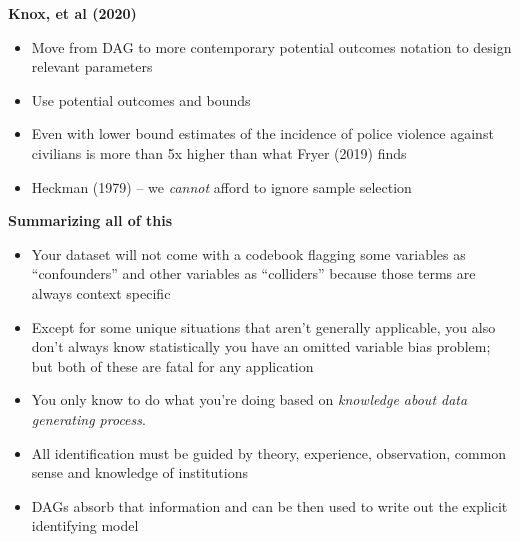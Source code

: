 \documentclass[notes=show]{beamer}
\begin{document}
\begin{frame}[plain]
\begin{center}
\textbf{Knox, et al (2020)}
\end{center}

\begin{itemize}
\item Move from DAG to more contemporary potential outcomes notation to design relevant parameters
\item Use potential outcomes and bounds
\item Even with lower bound estimates of the incidence of police violence against civilians is more than 5x higher than what Fryer (2019) finds
\item Heckman (1979) -- we \emph{cannot} afford to ignore sample selection
\end{itemize}

\end{frame}





\begin{frame}[plain]
\begin{center}
\textbf{Summarizing all of this}
\end{center}

\begin{itemize}
\item Your dataset will not come with a codebook flagging some variables as ``confounders'' and other variables as ``colliders'' because those terms are always context specific
\item Except for some unique situations that aren't generally applicable, you also don't always know statistically you have an omitted variable bias problem; but both of these are fatal for any application
\item You only know to do what you're doing based on \emph{knowledge about data generating process}. 
\item All identification must be guided by theory, experience, observation, common sense and knowledge of institutions 
\item DAGs absorb that information and can be then used to write out the explicit identifying model
\end{itemize}

\end{frame}
\end{document}
